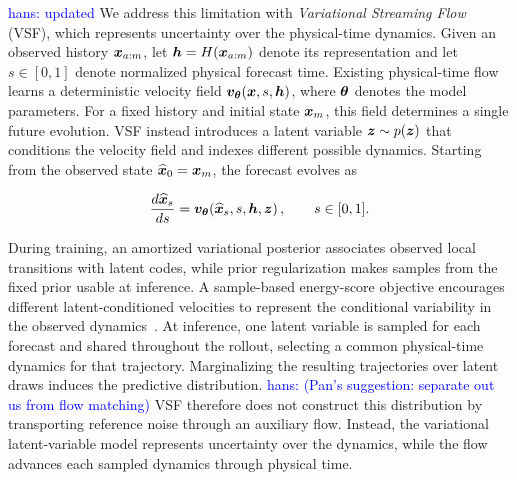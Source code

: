 \documentclass{article} %
\numberwithin{equation}{section}
\newcommand{\hans}[1]{\textcolor{blue}{hans: #1}}
\newcommand{\pan}[1]{\textcolor{red}{PL: #1}}
\begin{document}
\hans{updated} We address this limitation with \emph{Variational Streaming Flow} (VSF), which represents uncertainty over the physical-time dynamics. Given an observed history ${\bm{x}}_{a:m}$, let ${\bm{h}}=H({\bm{x}}_{a:m})$ denote its representation and let $s\in[0,1]$ denote normalized physical forecast time. Existing physical-time flow~\cite{jiang2025streaming} learns a deterministic velocity field ${\bm{v}}_{{\bm{\theta}}}({\bm{x}},s,{\bm{h}})$, where ${\bm{\theta}}$ denotes the model parameters. For a fixed history and initial state ${\bm{x}}_m$, this field determines a single future evolution. VSF instead introduces a latent variable ${\bm{z}}\sim p({\bm{z}})$ that conditions the velocity field and indexes different possible dynamics. Starting from the observed state $\widehat{{\bm{x}}}_0={\bm{x}}_m$, the forecast evolves as
%
\begin{tcolorbox}[
  colback=parchment,
  colframe=sandborder,
  boxrule=0.3pt,
  left=8pt,
  right=8pt,
  top=3pt,
  bottom=3pt
]
\begin{equation}
\frac{d\widehat{{\bm{x}}}_s}{ds}
=
{\bm{v}}_{{\bm{\theta}}}\!\left(
    \widehat{{\bm{x}}}_s,s,{\bm{h}},{\bm{z}}
\right),
\qquad s\in[0,1].
\label{eq:intro_vsf}
\end{equation}
\end{tcolorbox}
% 
During training, an amortized variational posterior associates observed local transitions with latent codes, while prior regularization makes samples from the fixed prior usable at inference. A sample-based energy-score objective encourages different latent-conditioned velocities to represent the conditional variability in the observed dynamics~\citep{gneiting2007strictly,bouchacourt2016disco}. At inference, one latent variable is sampled for each forecast and shared throughout the rollout, selecting a common physical-time dynamics for that trajectory. Marginalizing the resulting trajectories over latent draws induces the predictive distribution. \hans{(Pan's suggestion: separate out us from flow matching)} VSF therefore does not construct this distribution by transporting reference noise through an auxiliary flow. Instead, the variational latent-variable model represents uncertainty over the dynamics, while the flow advances each sampled dynamics through physical time.
\end{document}
